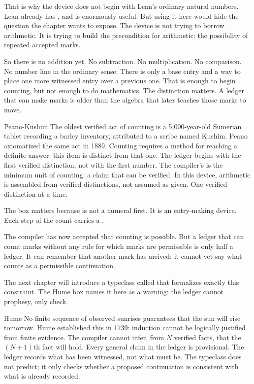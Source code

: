 That is why the device does not begin with Lean's ordinary natural numbers.
Lean already has , and  is enormously useful. But using it
here would hide the question the chapter wants to expose. The device is not
trying to borrow arithmetic. It is trying to build the precondition for
arithmetic: the possibility of repeated accepted marks.

So there is no addition yet. No subtraction. No multiplication. No comparison.
No number line in the ordinary sense. There is only a base entry and
a way to place one more witnessed entry over a previous one. That is enough to
begin counting, but not enough to do mathematics. The distinction matters. A
ledger that can make marks is older than the algebra that later teaches those
marks to move.

\begin{gphenom}{Peano-Kushim}
\label{ph:peano-kushim}
\GPhObs The oldest verified act of counting is a 5,000-year-old Sumerian tablet
recording a barley inventory, attributed to a scribe named Kushim.
Peano axiomatized the same act in 1889.
\GPhCon Counting requires a method for reaching a definite answer:
this item is distinct from that one.
The ledger begins with the first verified distinction, not with the first number.
\GPhSeq The compiler's  is the minimum unit of counting:
a claim that can be verified. In this device, arithmetic is assembled from
verified distinctions, not assumed as given. One verified distinction at a time.
\end{gphenom}

The box matters because  is not a numeral first. It is an
entry-making device. Each step of the count carries a .

The compiler has now accepted that counting is possible. But a ledger that can
count marks without any rule for which marks are permissible is only half a
ledger. It can remember that another mark has arrived; it cannot yet say what
counts as a permissible continuation.

The next chapter will introduce a typeclass called  that
formalizes exactly this constraint. The Hume box names it here as a warning:
the ledger cannot prophesy, only check.

\begin{gphenom}{Hume}
\label{ph:hume}
\GPhObs No finite sequence of observed sunrises guarantees that the sun will
rise tomorrow. Hume established this in 1739: induction cannot be
logically justified from finite evidence.
\GPhCon The compiler cannot infer, from $N$ verified facts, that the $(N+1)$th
fact will hold. Every general claim in the ledger is provisional.
\GPhSeq The ledger records what has been witnessed, not what must be.
The  typeclass does not predict; it only checks
whether a proposed continuation is consistent with what is already recorded.
\end{gphenom}

